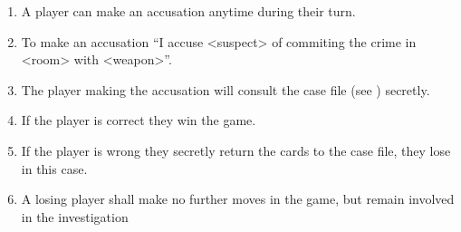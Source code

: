 \documentclass[10pt]{article}
\begin{document}
\begin{enumerate}[label=G.\arabic*]
\begin{enumerate}
    \item A player can make an accusation anytime during their turn.
    \item To make an accusation ``I accuse <suspect> of commiting the crime in <room> with <weapon>''.
    \item The player making the accusation will consult the case file (see \label{reqG.11}) secretly.
    \item If the player is correct they win the game.
    \item If the player is wrong they secretly return the cards to the case file, they lose in this case.
    \item A losing player shall make no further moves in the game, but remain involved in the investigation  
\end{enumerate}
\end{enumerate}
\end{document}
